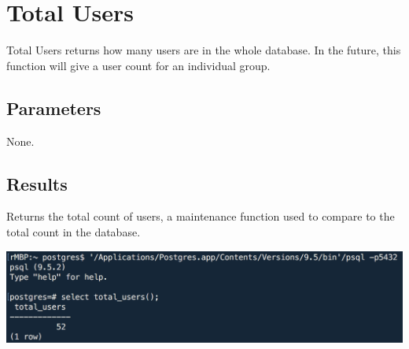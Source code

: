 \section{Total Users}
Total Users returns how many users are in the whole database. In the future, this function will give a user count for an individual group.

\subsection*{Parameters}
None.

\subsection*{Results}
Returns the total count of users, a maintenance function used to compare to the total count in the database.

\begin{center}
\includegraphics[width=\columnwidth]{include/assets/screenshots/total_users}
\end{center}